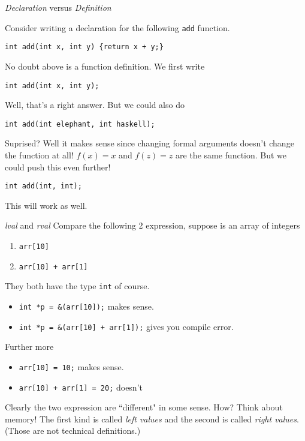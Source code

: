 \begin{frame}[fragile]{\textit{Declaration} versus \textit{Definition}}

Consider writing a declaration for the following \texttt{add} function.
\begin{verbatim}
int add(int x, int y) {return x + y;}
\end{verbatim}
No doubt above is a function definition. We first write
\begin{verbatim}
int add(int x, int y);
\end{verbatim}
Well, that's a right answer. But we could also do
\begin{verbatim}
int add(int elephant, int haskell);
\end{verbatim}
Suprised? Well it makes sense since changing formal arguments doesn't change the function at all! $f(x) = x$ and $f(z) = z$ are the same function. But we could push this even further!
\begin{verbatim}
int add(int, int);
\end{verbatim}
This will work as well.
\end{frame}

\begin{frame}[fragile]{\textit{lval} and \textit{rval}}
Compare the following 2 expression, suppose  is an array of integers
\begin{enumerate}
	\item \texttt{arr[10]}
	\item \texttt{arr[10] + arr[1]}
\end{enumerate}
They both have the type \texttt{int} of course. 
\begin{itemize}
	\item \texttt{int *p = &(arr[10]);} makes sense.
	\item \texttt{int *p = &(arr[10] + arr[1]);} gives you compile error.
\end{itemize}  
Further more
\begin{itemize}
	\item \texttt{arr[10] = 10;} makes sense.
	\item \texttt{arr[10] + arr[1] = 20;} doesn't
\end{itemize} 
Clearly the two expression are ``different" in some sense. How? Think about memory! The first kind is called \textit{left values} and the second is called \textit{right values}. (Those are not technical definitions.)
\end{frame}

